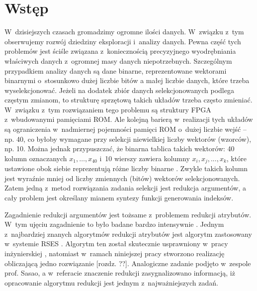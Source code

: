 \chapter{Wstęp}

W~dzisiejszych czasach gromadzimy ogromne ilości danych.
W~związku z~tym obserwujemy rozwój dziedziny eksploracji i~analizy danych.
Pewna część tych problemów jest ściśle związana z~koniecznością precyzyjnego wyodrębniania właściwych danych z~ogromnej masy danych niepotrzebnych.
Szczególnym przypadkiem analizy danych są dane binarne, reprezentowane wektorami binarnymi o~stosunkowo dużej liczbie bitów a małej liczbie danych,
które trzeba wyselekcjonować.
Jeżeli na dodatek zbiór danych selekcjonowanych podlega częstym zmianom,
to strukturę sprzętową takich układów trzeba często zmieniać.
W~związku z~tym rozwiązaniem tego problemu są struktury FPGA z~wbudowanymi pamięciami ROM.
Ale kolejną barierą w~realizacji tych układów są ograniczenia w~nadmiernej pojemności pamięci ROM o~dużej liczbie wejść – np. 40,
co byłoby wymagane przy selekcji niewielkiej liczby wektorów (wzorców), np. 10.
Można jednak przypuszczać, że binarna tablica takich wektorów: 40 kolumn oznaczanych $x_1,…,x_{40}$ i~10 wierszy zawiera kolumny $x_i, x_j, ..., x_k$,
które ustawione obok siebie reprezentują różne liczby binarne \cite{sasao-workshop}.
Zwykle takich kolumn jest wyraźnie mniej od liczby zmiennych (bitów) wektorów selekcjonowanych.
Zatem jedną z~metod rozwiązania zadania selekcji jest redukcja argumentów,
a cały problem jest określany mianem syntezy funkcji generowania indeksów.

Zagadnienie redukcji argumentów jest tożsame z~problemem redukcji atrybutów.
W~tym ujęciu zagadnienie to było badane bardzo intensywnie \cite{fast-algorithm, efektywna-procedura, new-reduction, steinbach-posthoff, skowron-rauszer, slezak, novel-method}.
Jednym z~najbardziej znanych algorytmów redukcji atrybutów jest algorytm zastosowany w~systemie RSES \cite{rses}.
Algorytm ten został skutecznie usprawniony w~pracy inżynierskiej \cite{efektywna-procedura},
natomiast w~ramach niniejszej pracy stworzono realizację obliczającą jedno rozwiązanie [rozdz. ??].
Analogiczne zadanie podjęto w~zespole prof. Sasao,
a w~referacie \cite{sasao-workshop} znaczenie redukcji zasygnalizowano informacją,
iż opracowanie algorytmu redukcji jest jednym z~najważniejszych zadań.

